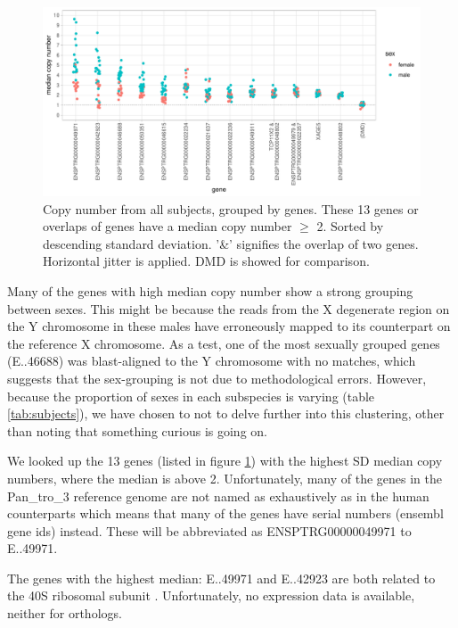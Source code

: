 \begin{figure}[h] 
  \centering
  \includegraphics[scale=0.78]{figures/fig_main_3.pdf}
  \caption{Copy number from all subjects, grouped by genes. %
  These 13 genes or overlaps of genes have a median copy number $\geq$ 2. Sorted by descending standard deviation. '\&' signifies the overlap of two genes. Horizontal jitter is applied. DMD is showed for comparison. }
  \label{fig:fig_main}
\end{figure}

Many of the genes with high median copy number show a strong grouping between sexes. This might be because the reads from the X degenerate region on the Y chromosome\cite{skaletsklyMSY} in these males have erroneously mapped to its counterpart on the reference X chromosome. 
As a test, one of the most sexually grouped genes (E..46688) was blast-aligned to the Y chromosome with no matches, which suggests that the sex-grouping is not due to methodological errors. However, because the proportion of sexes in each subspecies is varying (table \ref{tab:subjects}), we have chosen to not to delve further into this clustering, other than noting that something curious is going on. 

We looked up the 13 genes (listed in figure \ref{fig:fig_main}) with the highest SD median copy numbers, where the median is above 2. Unfortunately, many of the genes in the Pan\_tro\_3 reference genome are not named as exhaustively as in the human counterparts which means that many of the genes have serial numbers (ensembl gene ids) instead. These will be abbreviated as ENSPTRG00000049971 to E..49971. 

The genes with the highest median: E..49971 and E..42923 are both related to the 40S ribosomal subunit \cite{ensembl}. Unfortunately, no expression data is available, neither for orthologs.


